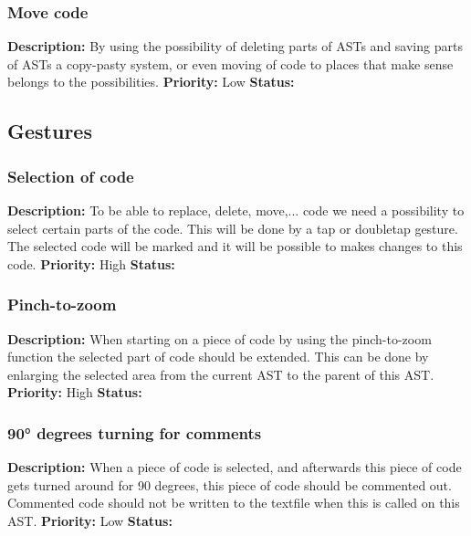 \documentclass[a4paper,12pt]{report}
\begin{document}
\subsubsection{Move code}
\textbf{Description: } By using the possibility of deleting parts of ASTs and saving parts of ASTs a copy-pasty system, or even moving of code to places that make sense belongs
to the possibilities.\newline
\textbf{Priority:} Low \newline
\textbf{Status: } \newline
\subsection{Gestures}
\subsubsection{Selection of code}
\textbf{Description: } To be able to replace, delete, move,... code we need a possibility to select certain parts of the code. This will be done
by a tap or doubletap gesture. The selected code will be marked and it will be possible to makes changes to this code.\newline
\textbf{Priority:} High \newline
\textbf{Status: } \newline
\subsubsection{Pinch-to-zoom}
\textbf{Description: }When starting on a piece of code by using the pinch-to-zoom function the selected part of code should be extended. This can be done by enlarging the selected
area from the current AST to the parent of this AST. \newline
\textbf{Priority:} High \newline
\textbf{Status: } \newline
\subsubsection{90° degrees turning for comments}
\textbf{Description: }When a piece of code is selected, and afterwards this piece of code gets turned around for 90 degrees, this piece of code should be commented out. 
Commented code should not be written to the textfile when this is called on this AST. \newline
\textbf{Priority:} Low \newline
\textbf{Status: } \newline
\end{document}
